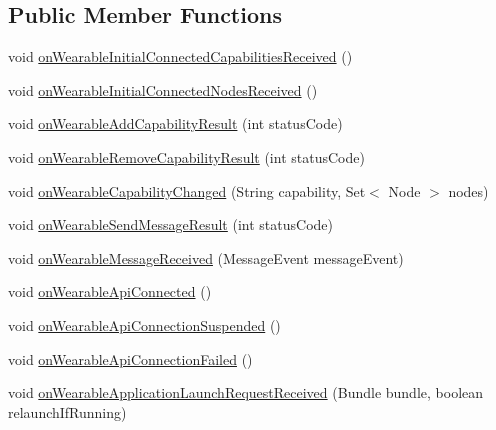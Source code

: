 \subsection*{Public Member Functions}
\begin{DoxyCompactItemize}
\item 
void \hyperlink{classcom_1_1google_1_1devrel_1_1wcl_1_1callbacks_1_1AbstractWearConsumer_a8681bf340eb758f41f0a6de3b323d4b7}{on\+Wearable\+Initial\+Connected\+Capabilities\+Received} ()
\item 
void \hyperlink{classcom_1_1google_1_1devrel_1_1wcl_1_1callbacks_1_1AbstractWearConsumer_a61becf80d04512b2fda004f4eeb748fc}{on\+Wearable\+Initial\+Connected\+Nodes\+Received} ()
\item 
void \hyperlink{classcom_1_1google_1_1devrel_1_1wcl_1_1callbacks_1_1AbstractWearConsumer_acda47e857020f6088b139af51e2a261a}{on\+Wearable\+Add\+Capability\+Result} (int status\+Code)
\item 
void \hyperlink{classcom_1_1google_1_1devrel_1_1wcl_1_1callbacks_1_1AbstractWearConsumer_a892e5f74a9211a4638c1eb3f6e7c831e}{on\+Wearable\+Remove\+Capability\+Result} (int status\+Code)
\item 
void \hyperlink{classcom_1_1google_1_1devrel_1_1wcl_1_1callbacks_1_1AbstractWearConsumer_a5dec2ea6ca63dfaaf4acffe396f61269}{on\+Wearable\+Capability\+Changed} (String capability, Set$<$ Node $>$ nodes)
\item 
void \hyperlink{classcom_1_1google_1_1devrel_1_1wcl_1_1callbacks_1_1AbstractWearConsumer_a5912eb69f1597c70992f4c666e9a9073}{on\+Wearable\+Send\+Message\+Result} (int status\+Code)
\item 
void \hyperlink{classcom_1_1google_1_1devrel_1_1wcl_1_1callbacks_1_1AbstractWearConsumer_a4d7128fde1585577c2b8a971175384b6}{on\+Wearable\+Message\+Received} (Message\+Event message\+Event)
\item 
void \hyperlink{classcom_1_1google_1_1devrel_1_1wcl_1_1callbacks_1_1AbstractWearConsumer_a6138a4cc2fcd834f3a00136c276af684}{on\+Wearable\+Api\+Connected} ()
\item 
void \hyperlink{classcom_1_1google_1_1devrel_1_1wcl_1_1callbacks_1_1AbstractWearConsumer_a40173bb3f8b148fc7366ad3759ace271}{on\+Wearable\+Api\+Connection\+Suspended} ()
\item 
void \hyperlink{classcom_1_1google_1_1devrel_1_1wcl_1_1callbacks_1_1AbstractWearConsumer_ac30fdfaa5c52d15faf2fa84ab8bde2ea}{on\+Wearable\+Api\+Connection\+Failed} ()
\item 
void \hyperlink{classcom_1_1google_1_1devrel_1_1wcl_1_1callbacks_1_1AbstractWearConsumer_a59cee3b7805b7f6d3ed149fad6acfb94}{on\+Wearable\+Application\+Launch\+Request\+Received} (Bundle bundle, boolean relaunch\+If\+Running)

\end{DoxyCompactItemize}
